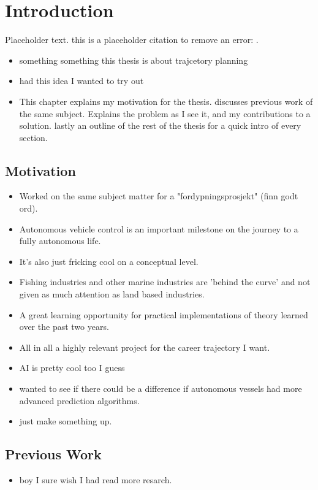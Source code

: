 \section{Introduction}
Placeholder text. this is a placeholder citation to remove an error: \cite{breivik2017mpc}.
\begin{itemize}
    \item something something this thesis is about trajcetory planning
    \item had this idea I wanted to try out
    \item This chapter explains my motivation for the thesis. discusses previous work of the same subject.
    Explains the problem as I see it, and my contributions to a solution. lastly an outline of the rest of the thesis for a quick intro of every section.
\end{itemize}
\subsection{Motivation}
\begin{itemize}
    \item Worked on the same subject matter for a "fordypningsprosjekt" (finn godt ord).
    \item Autonomous vehicle control is an important milestone on the journey to a fully autonomous life.
    \item It's also just fricking cool on a conceptual level.
    \item Fishing industries and other marine industries are 'behind the curve' and not given as much attention as land based industries.
    \item A great learning opportunity for practical implementations of theory learned over the past two years.
    \item All in all a highly relevant project for the career trajectory I want.
    \item AI is pretty cool too I guess
    \item wanted to see if there could be a difference if autonomous vessels had more advanced prediction algorithms.
    \item just make something up.
\end{itemize}

\subsection{Previous Work}
\begin{itemize}
    \item boy I sure wish I had read more resarch.
\end{itemize}

